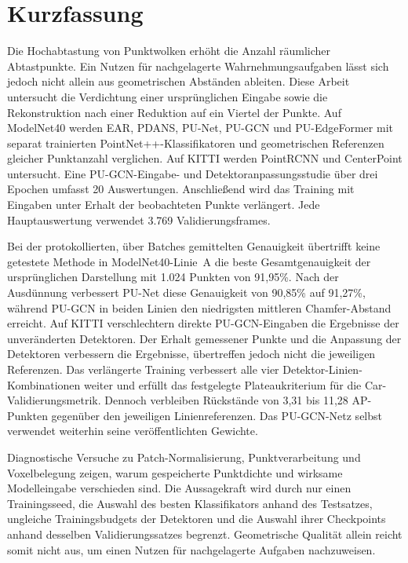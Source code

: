 \chapter*{Kurzfassung}
Die Hochabtastung von Punktwolken erhöht die Anzahl räumlicher Abtastpunkte.
Ein Nutzen für nachgelagerte Wahrnehmungsaufgaben lässt sich jedoch nicht
allein aus geometrischen Abständen ableiten. Diese Arbeit untersucht die
Verdichtung einer ursprünglichen Eingabe sowie die Rekonstruktion nach
einer Reduktion auf ein Viertel der Punkte. Auf ModelNet40 werden EAR,
PDANS, PU-Net, PU-GCN und PU-EdgeFormer mit separat trainierten
PointNet++-Klassifikatoren und geometrischen Referenzen gleicher
Punktanzahl verglichen. Auf KITTI werden PointRCNN und CenterPoint
untersucht. Eine PU-GCN-Eingabe- und Detektoranpassungsstudie über drei
Epochen umfasst 20 Auswertungen. Anschließend wird das Training mit
Eingaben unter Erhalt der beobachteten Punkte verlängert. Jede
Hauptauswertung verwendet 3.769 Validierungsframes.

Bei der protokollierten, über Batches gemittelten Genauigkeit übertrifft
keine getestete Methode in ModelNet40-Linie~A die beste
Gesamtgenauigkeit der ursprünglichen Darstellung mit 1.024 Punkten
von 91,95\%. Nach der Ausdünnung verbessert PU-Net diese Genauigkeit
von 90,85\% auf 91,27\%, während PU-GCN in beiden Linien den niedrigsten
mittleren Chamfer-Abstand erreicht. Auf KITTI verschlechtern direkte
PU-GCN-Eingaben die Ergebnisse der unveränderten Detektoren. Der Erhalt
gemessener Punkte und die Anpassung der Detektoren verbessern die
Ergebnisse, übertreffen jedoch nicht die jeweiligen Referenzen. Das
verlängerte Training verbessert alle vier Detektor-Linien-Kombinationen
weiter und erfüllt das festgelegte Plateaukriterium für die
Car-Validierungsmetrik. Dennoch verbleiben Rückstände von 3,31 bis
11,28 AP-Punkten gegenüber den jeweiligen Linienreferenzen. Das
PU-GCN-Netz selbst verwendet weiterhin seine veröffentlichten Gewichte.

Diagnostische Versuche zu Patch-Normalisierung, Punktverarbeitung und
Voxelbelegung zeigen, warum gespeicherte Punktdichte und wirksame
Modelleingabe verschieden sind. Die Aussagekraft wird durch nur einen
Trainingsseed, die Auswahl des besten Klassifikators anhand des Testsatzes,
ungleiche Trainingsbudgets der Detektoren und die Auswahl ihrer
Checkpoints anhand desselben Validierungssatzes begrenzt. Geometrische Qualität allein reicht somit nicht aus, um einen Nutzen
für nachgelagerte Aufgaben nachzuweisen.
